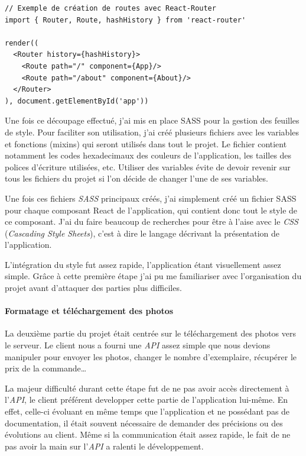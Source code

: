 \begin{verbatim}
// Exemple de création de routes avec React-Router
import { Router, Route, hashHistory } from 'react-router'

render((
  <Router history={hashHistory}>
    <Route path="/" component={App}/>
    <Route path="/about" component={About}/>
  </Router>
), document.getElementById('app'))
\end{verbatim}

\bigskip

Une fois ce découpage effectué, j'ai mis en place SASS pour la gestion
des feuilles de style. Pour faciliter son utilisation, j'ai créé
plusieurs fichiers avec les variables et fonctions (mixins) qui seront
utilisés dans tout le projet. Le fichier contient notamment les codes
hexadecimaux des couleurs de l'application, les tailles des polices
d'écriture utilisées, etc. Utiliser des variables évite de devoir
revenir sur tous les fichiers du projet si l'on décide de changer l'une
de ses variables.

\bigskip

Une fois ces fichiers \emph{SASS} principaux créés, j'ai simplement créé
un fichier SASS pour chaque composant React de l'application, qui
contient donc tout le style de ce composant. J'ai du faire beaucoup de
recherches pour être à l'aise avec le \emph{CSS} (\emph{Cascading Style
Sheets}), c'est à dire le langage décrivant la présentation de
l'application.

\bigskip

L'intégration du style fut assez rapide, l'application étant
visuellement assez simple. Grâce à cette première étape j'ai pu me
familiariser avec l'organisation du projet avant d'attaquer des parties
plus difficiles.

\bigskip

\paragraph{Formatage et téléchargement des
photos}\label{formatage-et-tuxe9luxe9chargement-des-photos}

\bigskip

La deuxième partie du projet était centrée sur le téléchargement des
photos vers le serveur. Le client nous a fourni une \emph{API} assez
simple que nous devions manipuler pour envoyer les photos, changer le
nombre d'exemplaire, récupérer le prix de la commande\ldots{}

\bigskip

La majeur difficulté durant cette étape fut de ne pas avoir accès
directement à l'\emph{API}, le client préférent developper cette partie
de l'application lui-même. En effet, celle-ci évoluant en même temps que
l'application et ne possédant pas de documentation, il était souvent
nécessaire de demander des précisions ou des évolutions au client. Même
si la communication était assez rapide, le fait de ne pas avoir la main
sur l'\emph{API} a ralenti le développement.

